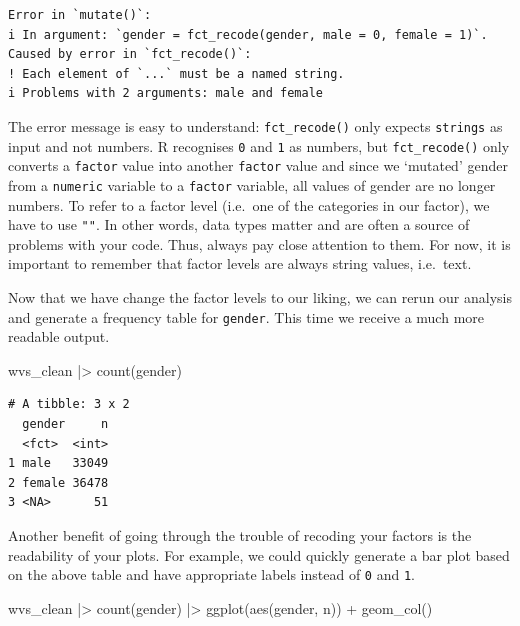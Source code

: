 \documentclass[
  letterpaper,
]{krantz}
\makeatletter
\newenvironment{Shaded}{\begin{snugshade}}{\end{snugshade}}
\newcommand{\FunctionTok}[1]{\textcolor[rgb]{0.28,0.35,0.67}{#1}}
\newcommand{\NormalTok}[1]{\textcolor[rgb]{0.00,0.23,0.31}{#1}}
\newcommand{\SpecialCharTok}[1]{\textcolor[rgb]{0.37,0.37,0.37}{#1}}
\newenvironment{kframe}{%
\medskip{}
\setlength{\fboxsep}{.8em}
 \def\at@end@of@kframe{}%
 \ifinner\ifhmode%
  \def\at@end@of@kframe{\end{minipage}}%
  \begin{minipage}{\columnwidth}%
 \fi\fi%
 \def\FrameCommand##1{\hskip\@totalleftmargin \hskip-\fboxsep
 \colorbox{shadecolor}{##1}\hskip-\fboxsep
     \hskip-\linewidth \hskip-\@totalleftmargin \hskip\columnwidth}%
 \MakeFramed {\advance\hsize-\width
   \@totalleftmargin\z@ \linewidth\hsize
   \@setminipage}}%
 {\par\unskip\endMakeFramed%
 \at@end@of@kframe}
\renewenvironment{Shaded}{\begin{kframe}}{\end{kframe}}
\makeatother
\begin{document}
\begin{verbatim}
Error in `mutate()`:
i In argument: `gender = fct_recode(gender, male = 0, female = 1)`.
Caused by error in `fct_recode()`:
! Each element of `...` must be a named string.
i Problems with 2 arguments: male and female
\end{verbatim}

The error message is easy to understand: \texttt{fct\_recode()} only
expects \texttt{strings} as input and not numbers. R recognises
\texttt{0} and \texttt{1} as numbers, but \texttt{fct\_recode()} only
converts a \texttt{factor} value into another \texttt{factor} value and
since we `mutated' gender from a \texttt{numeric} variable to a
\texttt{factor} variable, all values of gender are no longer numbers. To
refer to a factor level (i.e.~one of the categories in our factor), we
have to use \texttt{""}. In other words, data types matter and are often
a source of problems with your code. Thus, always pay close attention to
them. For now, it is important to remember that factor levels are always
string values, i.e.~text.

Now that we have change the factor levels to our liking, we can rerun
our analysis and generate a frequency table for \texttt{gender}. This
time we receive a much more readable output.

\begin{Shaded}
\begin{Highlighting}[]
\NormalTok{wvs\_clean }\SpecialCharTok{|\textgreater{}} \FunctionTok{count}\NormalTok{(gender)}
\end{Highlighting}
\end{Shaded}

\begin{verbatim}
# A tibble: 3 x 2
  gender     n
  <fct>  <int>
1 male   33049
2 female 36478
3 <NA>      51
\end{verbatim}

Another benefit of going through the trouble of recoding your factors is
the readability of your plots. For example, we could quickly generate a
bar plot based on the above table and have appropriate labels instead of
\texttt{0} and \texttt{1}.

\begin{Shaded}
\begin{Highlighting}[]
\NormalTok{wvs\_clean }\SpecialCharTok{|\textgreater{}}
  \FunctionTok{count}\NormalTok{(gender) }\SpecialCharTok{|\textgreater{}}
  \FunctionTok{ggplot}\NormalTok{(}\FunctionTok{aes}\NormalTok{(gender, n)) }\SpecialCharTok{+}
  \FunctionTok{geom\_col}\NormalTok{()}
\end{Highlighting}
\end{Shaded}
\end{document}
